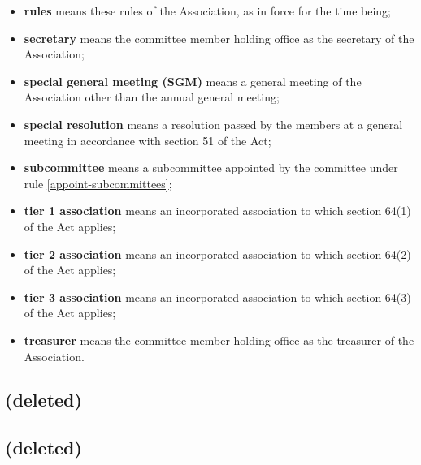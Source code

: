 \documentclass[../constitution.tex]{subfiles}
\begin{document}
\begin{itemize}[label={-}]
\item \textbf{rules} means these rules of the Association, as in force for the time being;
\item \textbf{secretary} means the committee member holding office as the secretary of the Association;
\item \textbf{special general meeting (SGM)} means a general meeting of the Association other than the annual general meeting;
\item \textbf{special resolution} means a resolution passed by the members at a general meeting in accordance with section 51 of the Act;
\item \textbf{subcommittee} means a subcommittee appointed by the committee under rule \ref{appoint-subcommittees};
\item \textbf{tier 1 association} means an incorporated association to which section 64(1) of the Act applies;
\item \textbf{tier 2 association} means an incorporated association to which section 64(2) of the Act applies;
\item \textbf{tier 3 association} means an incorporated association to which section 64(3) of the Act applies;
\item \textbf{treasurer} means the committee member holding office as the treasurer of the Association.
\end{itemize}


\subsection{(deleted)}


\subsection{(deleted)}

\end{document}
